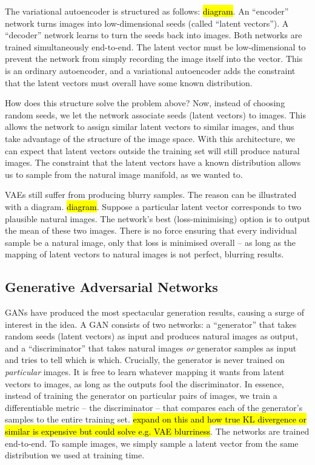 \documentclass[10pt,a4paper]{article}
\newcommand{\nquote}[1]{``{#1}''}
\begin{document}
The variational autoencoder \cite{??} is structured as follows: \hl{diagram}. An \nquote{encoder} network turns images into low-dimensional seeds (called \nquote{latent vectors}). A \nquote{decoder} network learns to turn the seeds back into images. Both networks are trained simultaneously end-to-end. The latent vector must be low-dimensional to prevent the network from simply recording the image itself into the vector. This is an ordinary autoencoder, and a variational autoencoder adds the constraint that the latent vectors must overall have some known distribution.

How does this structure solve the problem above? Now, instead of choosing random seeds, we let the network associate seeds (latent vectors) to images. This allows the network to assign similar latent vectors to similar images, and thus take advantage of the structure of the image space. With this architecture, we can expect that latent vectors outside the training set will still produce natural images. The constraint that the latent vectors have a known distribution allows us to sample from the natural image manifold, as we wanted to.

VAEs still suffer from producing blurry samples. The reason can be illustrated with a diagram. \hl{diagram}. Suppose a particular latent vector corresponds to two plausible natural images. The network's best (loss-minimising) option is to output the mean of these two images. There is no force ensuring that every individual sample be a natural image, only that loss is minimised overall -- as long as the mapping of latent vectors to natural images is not perfect, blurring results.

\subsection{Generative Adversarial Networks}

GANs have produced the most spectacular generation results, causing a surge of interest in the idea. A GAN consists of two networks: a \nquote{generator} that takes random seeds (latent vectors) as input and produces natural images as output, and a \nquote{discriminator} that takes natural images \emph{or} generator samples as input and tries to tell which is which. Crucially, the generator is never trained on \emph{particular} images. It is free to learn whatever mapping it wants from latent vectors to images, as long as the outputs fool the discriminator. In essence, instead of training the generator on particular pairs of images, we train a differentiable metric -- the discriminator -- that compares each of the generator's samples to the entire training set. \hl{expand on this and how true KL divergence or similar is expensive but could solve e.g. VAE blurriness}. The networks are trained end-to-end. To sample images, we simply sample a latent vector from the same distribution we used at training time.
\end{document}

